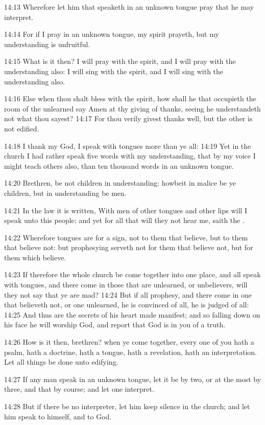 14:13 Wherefore let him that speaketh in an unknown tongue pray that
he may interpret.

14:14 For if I pray in an unknown tongue, my spirit prayeth, but my
understanding is unfruitful.

14:15 What is it then? I will pray with the spirit, and I will pray
with the understanding also: I will sing with the spirit, and I will
sing with the understanding also.

14:16 Else when thou shalt bless with the spirit, how shall he that
occupieth the room of the unlearned say Amen at thy giving of thanks,
seeing he understandeth not what thou sayest?  14:17 For thou verily
givest thanks well, but the other is not edified.

14:18 I thank my God, I speak with tongues more than ye all: 14:19 Yet
in the church I had rather speak five words with my understanding,
that by my voice I might teach others also, than ten thousand words in
an unknown tongue.

14:20 Brethren, be not children in understanding: howbeit in malice be
ye children, but in understanding be men.

14:21 In the law it is written, With men of other tongues and other
lips will I speak unto this people; and yet for all that will they not
hear me, saith the \LORD.

14:22 Wherefore tongues are for a sign, not to them that believe, but
to them that believe not: but prophesying serveth not for them that
believe not, but for them which believe.

14:23 If therefore the whole church be come together into one place,
and all speak with tongues, and there come in those that are
unlearned, or unbelievers, will they not say that ye are mad?  14:24
But if all prophesy, and there come in one that believeth not, or one
unlearned, he is convinced of all, he is judged of all: 14:25 And thus
are the secrets of his heart made manifest; and so falling down on his
face he will worship God, and report that God is in you of a truth.

14:26 How is it then, brethren? when ye come together, every one of
you hath a psalm, hath a doctrine, hath a tongue, hath a revelation,
hath an interpretation. Let all things be done unto edifying.

14:27 If any man speak in an unknown tongue, let it be by two, or at
the most by three, and that by course; and let one interpret.

14:28 But if there be no interpreter, let him keep silence in the
church; and let him speak to himself, and to God.

